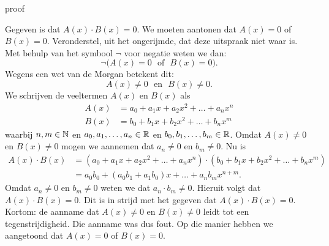 \documentclass{ximera}
\begin{document}
\begin{expandable}{proof}

Gegeven is dat $A(x)\cdot B(x) = 0$. We moeten aantonen dat $A(x) = 0$ of $B(x) = 0$. Veronderstel, uit het ongerijmde, dat deze uitspraak niet waar is. Met behulp van het symbool $\neg$ voor 
negatie weten we dan:
\[
\neg\bigl(A(x) = 0 \,\, \text{ of } \,\, B(x) = 0\bigr).
\]
Wegens een wet van de Morgan betekent dit:
\[
A(x) \neq 0 \,\, \text{ en } \,\, B(x) \neq 0.
\] 
We schrijven de veeltermen $A(x)$ en $B(x)$ als
\begin{align*}
A(x) & = a_0 + a_1 x + a_2 x^2 + \dots + a_n x^n \\
B(x) & = b_0 + b_1 x + b_2 x^2 + \dots + b_n x^m
\end{align*}
waarbij $n,m \in \mathbb{N}$ en $a_0, a_1, \ldots, a_n \in \mathbb{R}$ en $b_0, b_1, \ldots, b_m \in \mathbb{R}$. Omdat $A(x) \neq 0$ en $B(x) \neq 0$ mogen we aannemen dat $a_n \neq 0$ en $b_m \neq 0$. Nu is
\begin{align*}
A(x) \cdot B(x) 
& = \left(a_0 + a_1 x + a_2 x^2 + \dots + a_n x^n\right) \cdot \left( b_0 + b_1 x + b_2 x^2 + \dots + b_n x^m\right) \\
& = a_0b_0 + (a_0b_1 + a_1b_0)x + \dots + a_n b_m x^{n+m}.
\end{align*}
Omdat $a_n \neq 0$ en $b_m \neq 0$ weten we dat $a_n \cdot b_m \neq 0$. Hieruit volgt dat $A(x) \cdot B(x) = 0$. Dit is in strijd met het gegeven dat $A(x)\cdot B(x) = 0$. Kortom: de aanname dat $A(x) \neq 0$ en $B(x) \neq 0$ leidt tot een tegenstrijdigheid. Die aanname was dus fout. Op die manier hebben we aangetoond dat $A(x) = 0$ of $B(x) = 0$. 

\end{expandable}





\end{document}
